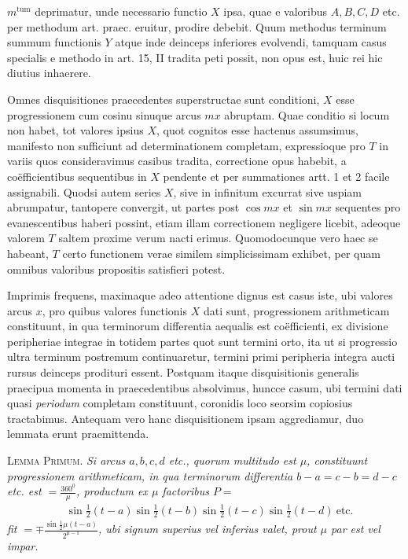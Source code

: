\begingroup
\renewcommand{\arraystretch}{1.45}
\noindent
\(m^{\mathrm{tum}}\) deprimatur, unde necessario functio \(X\) ipsa, quae e valoribus \(A,B,C,D\) etc. 
per methodum art. praec. eruitur, prodire debebit. Quum methodus terminum 
summum functionis \(Y\) atque inde deinceps inferiores evolvendi, tamquam casus 
specialis e methodo in art. 15, II tradita peti possit, non opus est, huic rei hic 
diutius inhaerere.

Omnes disquisitiones praecedentes superstructae sunt conditioni, \(X\) esse progressionem cum cosinu sinuque arcus \(mx\) abruptam. Quae conditio si locum non 
habet, tot valores ipsius \(X\), quot cognitos esse hactenus assumsimus, manifesto non 
sufficiunt ad determinationem completam, expressioque pro \(T\) in variis quos consideravimus casibus tradita, correctione opus habebit, a co\"efficientibus sequentibus 
in \(X\) pendente et per summationes artt. 1 et 2 facile assignabili. Quodsi autem 
series \(X\), sive in infinitum excurrat sive uspiam abrumpatur, tantopere convergit, 
ut partes post \(\cos mx\) et \(\sin mx\) sequentes pro evanescentibus haberi possint, 
etiam illam correctionem negligere licebit, adeoque valorem \(T\) saltem proxime 
verum nacti erimus. Quomodocunque vero haec se habeant, \(T\) certo functionem 
verae similem simplicissimam exhibet, per quam omnibus valoribus propositis satisfieri potest.

Imprimis frequens, maximaque adeo attentione dignus est casus iste, ubi 
valores arcus \(x\), pro quibus valores functionis \(X\) dati sunt, progressionem arithmeticam constituunt, in qua terminorum differentia aequalis est co\"efficienti, ex 
divisione peripheriae integrae in totidem partes quot sunt termini orto, ita ut si 
progressio ultra terminum postremum continuaretur, termini primi peripheria integra aucti rursus deinceps prodituri essent. Postquam itaque disquisitionis generalis praecipua momenta in praecedentibus absolvimus, huncce casum, ubi 
termini dati quasi \emph{periodum} completam constituunt, coronidis loco seorsim copiosius tractabimus. Antequam vero hanc disquisitionem ipsam aggrediamur, duo 
lemmata erunt praemittenda.

\textsc{Lemma Primum.} \emph{Si arcus \(a,b,c,d\) etc., quorum multitudo est \(\mu\), constituunt 
progressionem arithmeticam, in qua terminorum differentia \(b-a=c-b=d-c\) 
etc. est \(=\frac{360^{0}}{\mu}\), productum ex \(\mu\) factoribus \(P=\)}
\[
\begin{aligned}
&\sin\frac12(t-a)\sin\frac12(t-b)\sin\frac12(t-c)\sin\frac12(t-d)\ \mathrm{etc.}
\end{aligned}
\]
\noindent\emph{fit \(=\mp\frac{\sin\frac12\mu(t-a)}{2^{\mu-1}}\), ubi signum superius vel inferius valet, prout \(\mu\) par est vel impar.}

